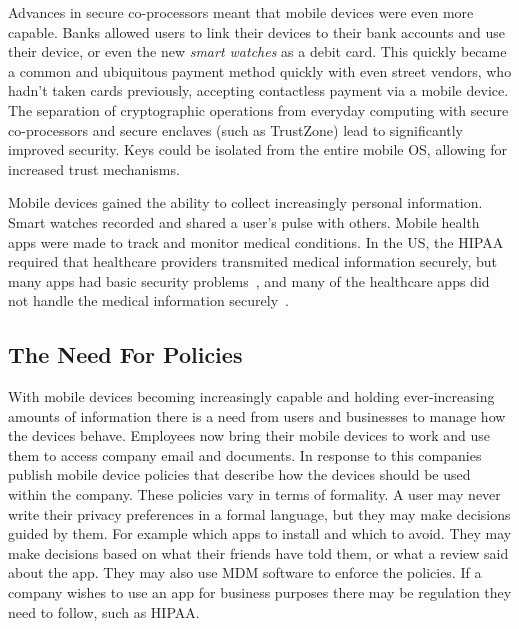 \documentclass[thesis.tex]{subfiles}
\begin{document}
Advances in secure co-processors meant that mobile devices were even
more capable.  Banks allowed users to link their devices to their bank
accounts and use their device, or even the new \emph{smart watches} as
a debit card.  This quickly became a common and ubiquitous payment
method quickly with even street vendors, who hadn't taken cards
previously, accepting contactless payment via a mobile device.  The
separation of cryptographic operations from everyday computing with
secure co-processors and secure enclaves (such as TrustZone) lead to
significantly improved security.  Keys could be isolated from the
entire mobile OS, allowing for increased trust mechanisms.

Mobile devices gained the ability to collect increasingly personal
information.  Smart watches recorded and shared a user's pulse with
others. Mobile health apps were made to track and monitor medical
conditions. In the US, the \ac{HIPAA} required that healthcare
providers transmited medical information securely, but many apps had
basic security problems~\cite{fahl_why_2012}, and many of the
healthcare apps did not handle the medical information
securely~\cite{knorr_privacy_2015}.


\subsection{The Need For Policies}

With mobile devices becoming increasingly capable and holding
ever-increasing amounts of information there is a need from users and
businesses to manage how the devices behave.  Employees now bring
their mobile devices to work and use them to access company email and
documents.  In response to this companies publish mobile device
policies that describe how the devices should be used within the
company.  These policies vary in terms of formality.  A user may never
write their privacy preferences in a formal language, but they may
make decisions guided by them.  For example which apps to install and
which to avoid.  They may make decisions based on what their friends
have told them, or what a review said about the app.  They may also
use \ac{MDM} software to enforce the policies.  If a company wishes to
use an app for business purposes there may be regulation they need to
follow, such as \ac{HIPAA}.
\end{document}
